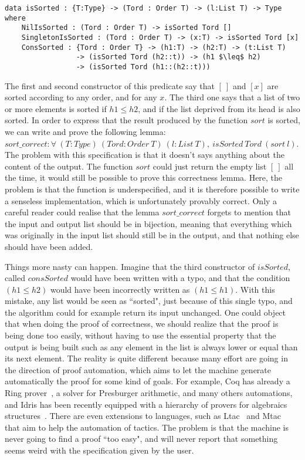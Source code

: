 \begin{lstlisting}
data isSorted : {T:Type} -> (Tord : Order T) -> (l:List T) -> Type where
    NilIsSorted : (Tord : Order T) -> isSorted Tord []
    SingletonIsSorted : (Tord : Order T) -> (x:T) -> isSorted Tord [x]
    ConsSorted : {Tord : Order T} -> (h1:T) -> (h2:T) -> (t:List T) 
                 -> (isSorted Tord (h2::t)) -> (h1 $\leq$ h2) 
                 -> (isSorted Tord (h1::(h2::t)))
\end{lstlisting}
The first and second constructor of this predicate say that $[\ ]$ and $[x]$ are sorted according to any order, and for any $x$. The third one says that a list of two or more elements is sorted if $h1 \le h2$, and if the list deprived from its head is also sorted. In order to express that the result produced by the function $sort$ is sorted, we can write and prove the following lemma:
$sort\_correct : \forall\ (T:Type)\ (Tord:Order\ T)\ (l:List\ T),\ isSorted\ Tord\ (sort\ l)$. The problem with this specification is that it doesn't says anything about the content of the output. The function $sort$ could just return the empty list $[\ ]$ all the time, it would still be possible to prove this correctness lemma. Here, the problem is that the function is underspecified, and it is therefore possible to write a senseless implementation, which is unfortunately provably correct. Only a careful reader could realise that the lemma $sort\_correct$ forgets to mention that the input and output list should be in bijection, meaning that everything which was originally in the input list should still be in the output, and that nothing else should have been added.

Things more nasty can happen. Imagine that the third constructor of $isSorted$, called $consSorted$ would have been written with a typo, and that the condition $(h1 \leq h2) $ would have been incorrectly written as $(h1 \leq h1)$. With this mistake, any list would be seen as ``sorted", just because of this single typo, and the algorithm could for example return its input unchanged. One could object that when doing the proof of correctness, we should realize that the proof is being done too easily, without having to use the essential property that the output is being built such as any element in the list is always lower or equal than its next element. The reality is quite different because many effort are going in the direction of proof automation, which aims to let the machine generate automatically the proof for some kind of goals. For example, Coq has already a Ring prover~\cite{coq2005}, a solver for Presburger arithmetic, and many others automations, and Idris has been recently equipped with a hierarchy of provers for algebraics structures~\cite{Slama2016}. There are even extensions to languages, such as Ltac~\cite{DelahayeLTac} and Mtac~\cite{Ziliani13} that aim to help the automation of tactics. The problem is that the machine is never going to find a proof ``too easy", and will never report that something seems weird with the specification given by the user.

